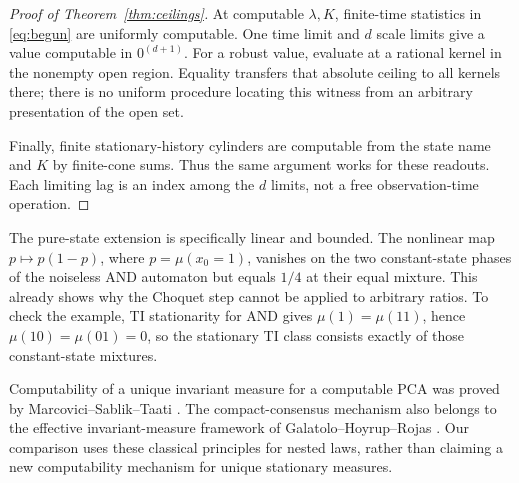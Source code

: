 \begin{proof}[Proof of Theorem~\ref{thm:ceilings}]
At computable $\lambda,K$, finite-time statistics in
\eqref{eq:begun} are uniformly computable. One time limit and $d$
scale limits give a value computable in $0^{(d+1)}$. For a robust
value, evaluate at a rational kernel in the nonempty open region.
Equality transfers that absolute ceiling to all kernels there;
there is no uniform procedure locating this witness from an
arbitrary presentation of the open set.

Finally, finite stationary-history cylinders are computable from
the state name and $K$ by finite-cone sums. Thus the same argument
works for these readouts. Each limiting lag is an index among the
$d$ limits, not a free observation-time operation.
\end{proof}

The pure-state extension is specifically linear and bounded.
The nonlinear map $p\mapsto p(1-p)$, where $p=\mu(x_0=1)$,
vanishes on the two constant-state phases of the noiseless AND
automaton but equals $1/4$ at their equal mixture. This already
shows why the Choquet step cannot be applied to arbitrary ratios.
To check the example, TI stationarity for AND gives
$\mu(1)=\mu(11)$, hence $\mu(10)=\mu(01)=0$, so the stationary TI
class consists exactly of those constant-state mixtures.

Computability of a unique invariant measure for a computable PCA
was proved by Marcovici--Sablik--Taati
\cite[Proposition~2.2]{marcovici}. The compact-consensus mechanism
also belongs to the effective invariant-measure framework of
Galatolo--Hoyrup--Rojas \cite{ghr}. Our comparison uses these
classical principles for nested laws, rather than claiming a new
computability mechanism for unique stationary measures.
